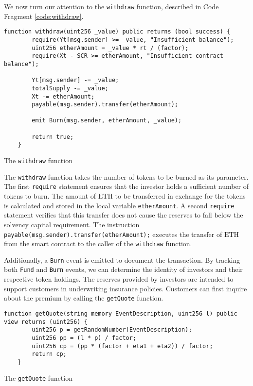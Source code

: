 \documentclass[10pt]{article}
\begin{document}
We now turn our attention to the \texttt{withdraw} function, described in Code Fragment \ref{code:withdraw}.


\begin{codefragment}[!h]
\begin{lstlisting}[language=Solidity]
function withdraw(uint256 _value) public returns (bool success) {
        require(Yt[msg.sender] >= _value, "Insufficient balance");
        uint256 etherAmount = _value * rt / (factor);
        require(Xt - SCR >= etherAmount, "Insufficient contract balance");

        Yt[msg.sender] -= _value;
        totalSupply -= _value;
        Xt -= etherAmount;
        payable(msg.sender).transfer(etherAmount);

        emit Burn(msg.sender, etherAmount, _value);
        
        return true;
    }
\end{lstlisting}
    \caption{The \texttt{withdraw} function}
    \label{code:withdraw}
\end{codefragment}

The \texttt{withdraw} function takes the number of tokens to be burned as its parameter. The first \texttt{require} statement ensures that the investor holds a sufficient number of tokens to burn. The amount of \(\text{ETH}\) to be transferred in exchange for the tokens is calculated and stored in the local variable \texttt{etherAmount}. A second \texttt{require} statement verifies that this transfer does not cause the reserves to fall below the solvency capital requirement. The instruction \texttt{payable(msg.sender).transfer(etherAmount);} executes the transfer of \(\text{ETH}\) from the smart contract to the caller of the \texttt{withdraw} function. 

Additionally, a \texttt{Burn} event is emitted to document the transaction. By tracking both \texttt{Fund} and \texttt{Burn} events, we can determine the identity of investors and their respective token holdings. The reserves provided by investors are intended to support customers in underwriting insurance policies. Customers can first inquire about the premium by calling the \texttt{getQuote} function.

\begin{codefragment}[!h]
\begin{lstlisting}[language=Solidity]
    function getQuote(string memory EventDescription, uint256 l) public view returns (uint256) {
        uint256 p = getRandomNumber(EventDescription);
        uint256 pp = (l * p) / factor;
        uint256 cp = (pp * (factor + eta1 + eta2)) / factor;
        return cp;
    }
\end{lstlisting}
    \caption{The \texttt{getQuote} function}
    \label{code:getQuote}
\end{codefragment}
\end{document}
